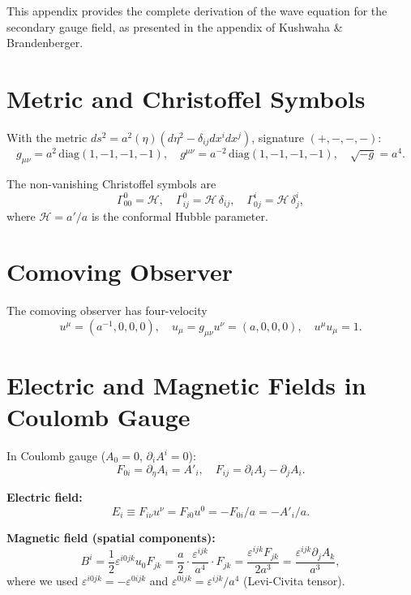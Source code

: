 \documentclass[12pt,a4paper]{report}
\theoremstyle{definition}
\begin{document}
This appendix provides the complete derivation of the wave equation for the secondary
gauge field, as presented in the appendix of Kushwaha \& Brandenberger.

\section{Metric and Christoffel Symbols}

With the metric $ds^2=a^2(\eta)(d\eta^2-\delta_{ij}dx^idx^j)$, signature $(+,-,-,-)$:
\begin{equation}
  g_{\mu\nu} = a^2\,\mathrm{diag}(1,-1,-1,-1), \quad
  g^{\mu\nu} = a^{-2}\,\mathrm{diag}(1,-1,-1,-1), \quad
  \sqrt{-g} = a^4.
\end{equation}

The non-vanishing Christoffel symbols are
\begin{equation}
  \Gamma^0_{00} = \mathcal{H}, \quad
  \Gamma^0_{ij} = \mathcal{H}\,\delta_{ij}, \quad
  \Gamma^i_{0j} = \mathcal{H}\,\delta^i_j,
\end{equation}
where $\mathcal{H}=a'/a$ is the conformal Hubble parameter.

\section{Comoving Observer}

The comoving observer has four-velocity
\begin{equation}
  u^\mu = (a^{-1},0,0,0), \quad u_\mu = g_{\mu\nu}u^\nu = (a,0,0,0), \quad u^\mu u_\mu = 1.
\end{equation}

\section{Electric and Magnetic Fields in Coulomb Gauge}

In Coulomb gauge ($A_0=0$, $\partial_i A^i=0$):
\begin{equation}
  F_{0i} = \partial_\eta A_i = A'_i, \quad F_{ij} = \partial_i A_j - \partial_j A_i.
\end{equation}

\textbf{Electric field:}
\begin{equation}
  E_i \equiv F_{i\nu}u^\nu = F_{i0}u^0 = -F_{0i}/a = -A'_i/a.
\end{equation}

\textbf{Magnetic field (spatial components):}
\begin{equation}
  B^i = \frac{1}{2}\varepsilon^{i0jk}u_0 F_{jk}
      = \frac{a}{2}\cdot\frac{\varepsilon^{ijk}}{a^4}\cdot F_{jk}
      = \frac{\varepsilon^{ijk}F_{jk}}{2a^3}
      = \frac{\varepsilon^{ijk}\partial_j A_k}{a^3},
\end{equation}
where we used $\varepsilon^{i0jk}=-\varepsilon^{0ijk}$ and
$\varepsilon^{0ijk} = \varepsilon^{ijk}/a^4$ (Levi-Civita tensor).
\end{document}
